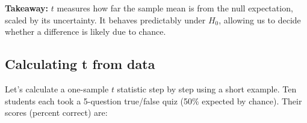 \documentclass[
  letterpaper,
  DIV=11,
  numbers=noendperiod]{scrreprt}
\newenvironment{Shaded}{\begin{snugshade}}{\end{snugshade}}
\newcommand{\AttributeTok}[1]{\textcolor[rgb]{0.40,0.45,0.13}{#1}}
\newcommand{\CommentTok}[1]{\textcolor[rgb]{0.37,0.37,0.37}{#1}}
\newcommand{\DecValTok}[1]{\textcolor[rgb]{0.68,0.00,0.00}{#1}}
\newcommand{\FunctionTok}[1]{\textcolor[rgb]{0.28,0.35,0.67}{#1}}
\newcommand{\NormalTok}[1]{\textcolor[rgb]{0.00,0.23,0.31}{#1}}
\newcommand{\OtherTok}[1]{\textcolor[rgb]{0.00,0.23,0.31}{#1}}
\newcommand{\SpecialCharTok}[1]{\textcolor[rgb]{0.37,0.37,0.37}{#1}}
\begin{document}
\textbf{Takeaway:} \(t\) measures how far the sample mean is from the
null expectation, scaled by its uncertainty. It behaves predictably
under \(H_0\), allowing us to decide whether a difference is likely due
to chance.

\subsection{Calculating t from data}\label{calculating-t-from-data}

Let's calculate a one-sample \(t\) statistic step by step using a short
example. Ten students each took a 5-question true/false quiz (50\%
expected by chance). Their scores (percent correct) are:

\begin{Shaded}
\end{Shaded}
\end{document}
